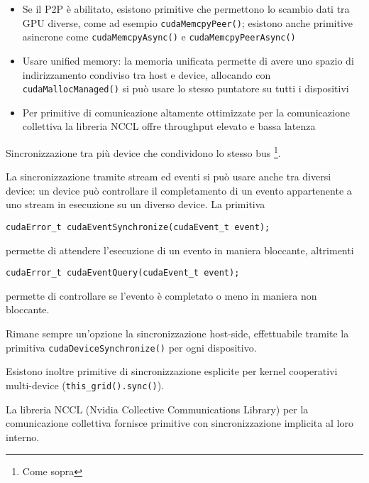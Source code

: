 \begin{questions}
\begin{solution}
\begin{itemize}
            \item Se il P2P è abilitato, esistono primitive che permettono lo scambio dati tra GPU diverse, come ad esempio \texttt{cudaMemcpyPeer()}; esistono anche primitive asincrone come \texttt{cudaMemcpyAsync()} e \texttt{cudaMemcpyPeerAsync()}
            
            \item Usare unified memory: la memoria unificata permette di avere uno spazio di indirizzamento condiviso tra host e device, allocando con \texttt{cudaMallocManaged()} si può usare lo stesso puntatore su tutti i dispositivi
            
            \item Per primitive di comunicazione altamente ottimizzate per la comunicazione collettiva la libreria NCCL offre throughput elevato e bassa latenza
        \end{itemize}
    \end{solution}
    
    \question Sincronizzazione tra più device che condividono lo stesso bus \footnote{Come sopra}.
    
    \begin{solution}
        La sincronizzazione tramite stream ed eventi si può usare anche tra diversi device: un device può controllare il completamento di un evento appartenente a uno stream in esecuzione su un diverso device. La primitiva
        \begin{verbatim}
cudaError_t cudaEventSynchronize(cudaEvent_t event);
        \end{verbatim}
        permette di attendere l'esecuzione di un evento in maniera bloccante, altrimenti
        \begin{verbatim}
cudaError_t cudaEventQuery(cudaEvent_t event);
        \end{verbatim}
        permette di controllare se l'evento è completato o meno in maniera non bloccante.
        
        Rimane sempre un'opzione la sincronizzazione host-side, effettuabile tramite la primitiva \texttt{cudaDeviceSynchronize()} per ogni dispositivo.
        
        Esistono inoltre primitive di sincronizzazione esplicite per kernel cooperativi multi-device (\texttt{this\_grid().sync()}).
        
        La libreria NCCL (Nvidia Collective Communications Library) per la comunicazione collettiva fornisce primitive con sincronizzazione implicita al loro interno.
    \end{solution}
    

\end{questions}
